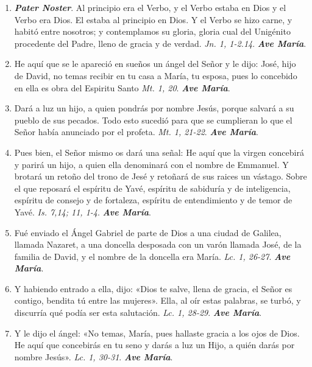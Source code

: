 \documentclass[../../devocionario.tex]{subfiles}
\begin{document}
    \begin{enumerate}

        \item \textbf{\textit{Pater Noster}}. Al principio era el Verbo, y el Verbo estaba en Dios y el Verbo era Dios. El estaba al principio en Dios. Y el Verbo se hizo carne, 
                y habitó entre nosotros; y contemplamos su gloria, gloria cual del Unigénito procedente del Padre, lleno de gracia y de verdad. 
                \textit{Jn. 1, 1-2.14}. \textbf{\textit{Ave María}}.

        \item He aquí que se le apareció en sueños un ángel del Señor y le dijo: José, hijo de David, no temas recibir en tu casa a María, tu esposa,
                pues lo concebido en ella es obra del Espiritu Santo \textit{Mt. 1, 20}. \textbf{\textit{Ave María}}.

        \item Dará a luz un hijo, a quien pondrás por nombre Jesús, porque salvará a su pueblo de sus pecados. Todo esto sucedió para que se cumplieran
                lo que el Señor había anunciado por el profeta. \textit{Mt. 1, 21-22}. \textbf{\textit{Ave María}}.
    
        \item Pues bien, el Señor mismo os dará una señal: He aquí que la virgen concebirá y parirá un hijo, 
                a quien ella denominará con el nombre de Emmanuel. Y brotará un retoño del trono de Jesé y retoñará de sus raices un vástago. 
                Sobre el que reposará el espíritu de Yavé, espíritu de sabiduría y de inteligencia, espíritu de consejo y de fortaleza, espíritu 
                de entendimiento y de temor de Yavé. \textit{Is. 7,14; 11, 1-4}. \textbf{\textit{Ave María}}.

        \item Fué enviado el Ángel Gabriel de parte de Dios a una ciudad de Galilea, llamada Nazaret, 
                a una doncella desposada con un varón llamada José, de la familia de David, y el nombre de la doncella era María. \textit{Lc. 1, 26-27}. \textbf{\textit{Ave María}}.

        \item Y habiendo entrado a ella, dijo: «Dios te salve, llena de gracia, el Señor es contigo, bendita tú entre las mujeres». 
                Ella, al oír estas palabras, se turbó, y discurría qué podía ser esta salutación. \textit{Lc. 1, 28-29}. \textbf{\textit{Ave María}}.

        \item Y le dijo el ángel: «No temas, María, pues hallaste gracia a los ojos de Dios. He aquí que concebirás en tu seno y darás a luz un Hijo, 
                a quién darás por nombre Jesús». \textit{Lc. 1, 30-31}. \textbf{\textit{Ave María}}.


\end{enumerate}
\end{document}
